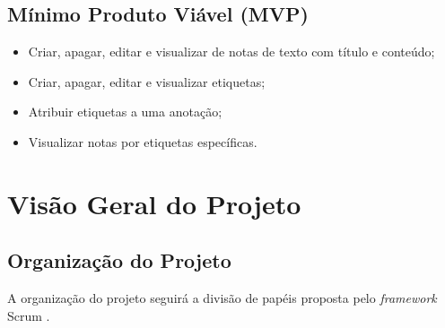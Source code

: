 \documentclass[
	12pt,				%
	oneside,			%
	a4paper,			%
	english,			%
	brazil,				%
	]{abntex2}
\begin{document}
\section{Mínimo Produto Viável (MVP)}
\begin{itemize}
    \item Criar, apagar, editar e visualizar de notas de texto com título e conteúdo;
    \item Criar, apagar, editar e visualizar etiquetas;
    \item Atribuir etiquetas a uma anotação;
    \item Visualizar notas por etiquetas específicas.
\end{itemize}

\chapter{Visão Geral do Projeto}
\section{Organização do Projeto}
A organização do projeto seguirá a divisão de papéis proposta pelo \textit{framework} Scrum \cite{scrum_guide}.
\end{document}
